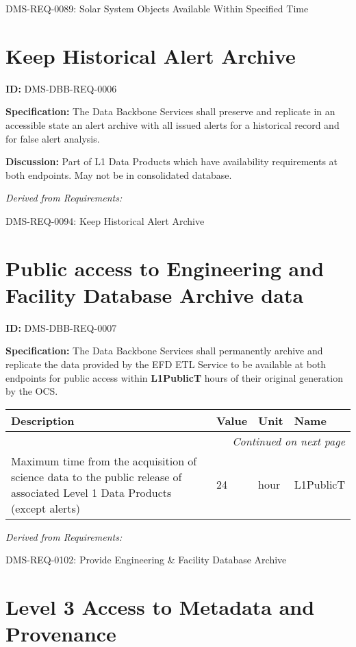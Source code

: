 \documentclass[SE,toc,lsstdraft]{lsstdoc}
\makeatletter
\newcommand{\paramname}[1]{\hspace{0pt}#1}
\newcommand{\unitname}[1]{\hspace{0pt}#1}
\newenvironment{parameters}[0]{%
\setlength\LTleft{0pt}
\setlength\LTright{\fill}
\begin{small}
\begin{longtable}[]{|p{0.49\textwidth}|l|p{0.6in}|p{1.70in}@{}|}

\hline \textbf{Description} & \textbf{Value} & \textbf{Unit} & \textbf{Name} \\ \hline
\endhead

\hline \multicolumn{4}{r}{\emph{Continued on next page}} \\
\endfoot

\hline\hline
\endlastfoot
}{%
\hline
\end{longtable}
\end{small}
}
\makeatother
\begin{document}
DMS-REQ-0089:
Solar System Objects Available Within Specified Time \newline

\section{Keep Historical Alert Archive}

\label{DMS-DBB-REQ-0006}
\textbf{ID:} DMS-DBB-REQ-0006

\textbf{Specification:}
The Data Backbone Services shall preserve and replicate in an accessible state an alert archive with all issued alerts for a historical record and for false alert analysis.

\textbf{Discussion:}
Part of L1 Data Products which have availability requirements at both endpoints.  May not be in consolidated database.

\emph{Derived from Requirements:}

DMS-REQ-0094:
Keep Historical Alert Archive \newline

\section{Public access to Engineering and Facility Database Archive data}

\label{DMS-DBB-REQ-0007}
\textbf{ID:} DMS-DBB-REQ-0007

\textbf{Specification:}
The Data Backbone Services shall permanently archive and replicate the data provided by the EFD ETL Service to be available at both endpoints for public access within \textbf{L1PublicT} hours of their original generation by the OCS.

\begin{parameters}
Maximum time from the acquisition of science data to the public release of associated Level 1 Data Products (except alerts)
&
24
&
\unitname{%
hour
}
&
\paramname{%
L1PublicT
} \\\hline
\end{parameters}

\emph{Derived from Requirements:}

DMS-REQ-0102:
Provide Engineering \& Facility Database Archive \newline

\section{Level 3 Access to Metadata and Provenance}
\end{document}
